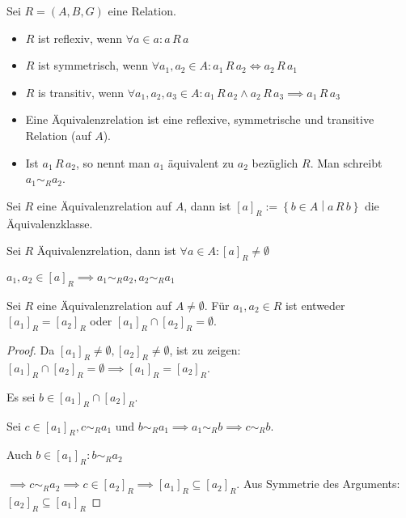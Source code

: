 \begin{definition}
  Sei $R = (A, B, G)$ eine Relation.
  \begin{itemize}
  \item $R$ ist reflexiv, wenn $\forall a \in a: a\, R\, a$
  \item $R$ ist symmetrisch, wenn $\forall a_1, a_2 \in A: a_1\, R\, a_2 \iff a_2\, R\, a_1$
  \item $R$ is transitiv, wenn $\forall a_1, a_2, a_3 \in A: a_1\, R\, a_2 \wedge a_2\, R\, a_3 \implies a_1\, R\, a_3$
  \item Eine Äquivalenzrelation ist eine reflexive, symmetrische und transitive Relation (auf $A$).
  \item Ist $a_1\,R\,a_2$, so nennt man $a_1$ äquivalent zu $a_2$ bezüglich $R$. Man schreibt $a_1 \sim_R a_2$.
  \end{itemize}

  Sei $R$ eine Äquivalenzrelation auf $A$, dann ist $[a]_R := \left\{ b \in A \middle| a\,R\,b \right\}$ die Äquivalenzklasse.
\end{definition}
\begin{remark}
  Sei $R$ Äquivalenzrelation, dann ist $\forall a \in A: [a]_R \ne \emptyset$

  $a_1, a_2 \in [a]_R \implies a_1 \sim_R a_2, a_2 \sim_R a_1$
\end{remark}
\begin{lemma}
  Sei $R$ eine Äquivalenzrelation auf $A \ne \emptyset$. Für $a_1, a_2 \in R$ ist entweder $[a_1]_R = [a_2]_R$ oder $[a_1]_R \cap [a_2]_R = \emptyset$.
\end{lemma}
\begin{proof}
  Da $[a_1]_R \ne \emptyset, [a_2]_R \ne \emptyset$, ist zu zeigen: $[a_1]_R \cap [a_2]_R = \emptyset \implies [a_1]_R = [a_2]_R$.

  Es sei $b \in [a_1]_R \cap [a_2]_R$.

  Sei $c \in [a_1]_R, c \sim_R a_1$ und $b \sim_R a_1 \implies a_1 \sim_R b \implies c \sim_R b$.

  Auch $b \in [a_1]_R: b \sim_R a_2$

  $\implies c \sim_R a_2 \implies c \in [a_2]_R \implies [a_1]_R \subseteq [a_2]_R$. Aus Symmetrie des Arguments: $[a_2]_R \subseteq [a_1]_R$
\end{proof}
